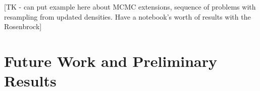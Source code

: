 [TK - can put example here about MCMC extensions, sequence of problems with resampling from updated densities. Have a notebook's worth of results with the Rosenbrock]



\section{Future Work and Preliminary Results}


\FloatBarrier



%
%



\FloatBarrier
